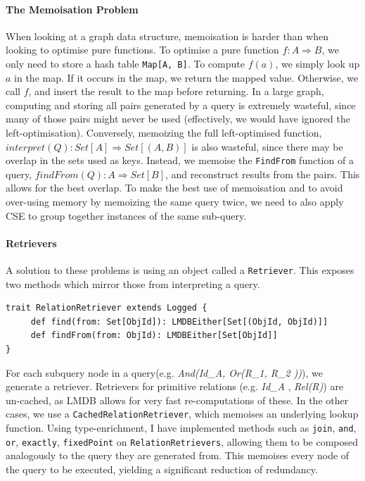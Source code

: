 \documentclass[12pt,a4paper,twoside,openright]{report}
\newcommand\codeName[1]{\texttt{#1}}
\newcommand\mathName[1]{\textit{#1}}
\renewcommand{\baselinestretch}{1.1}    %
\begin{document}
		\paragraph{The Memoisation Problem}
		When looking at a graph data structure, memoisation is harder than when looking to optimise pure functions. To optimise a pure function $f\colon A \Rightarrow B$, we only need to store a hash table \codeName{Map[A, B]}. To compute $f(a)$, we simply look up $a$ in the map. If it occurs in the map, we return the mapped value. Otherwise, we call $f$, and insert the result to the map before returning. In a large graph, computing and storing all pairs generated by a query is extremely wasteful, since many of those pairs might never be used (effectively, we would have ignored the left-optimisation). Conversely, memoizing the full left-optimised function, $interpret(Q)\colon Set[A] \Rightarrow Set[(A, B)]$ is also wasteful, since there may be overlap in the sets used as keys. Instead, we memoise the \codeName{FindFrom} function of a query, $findFrom(Q)\colon A \Rightarrow Set[B]$, and reconstruct results from the pairs. This allows for the best overlap. To make the best use of memoisation and to avoid over-using memory by memoizing the same query twice, we need to also apply CSE to group together instances of the same sub-query.

		\paragraph{Retrievers}
		A solution to these problems is using an object called a \codeName{Retriever}. This exposes two methods which mirror those from interpreting a query. 
		\renewcommand{\baselinestretch}{0.8}
		\begin{framed}
			\begin{verbatim}
trait RelationRetriever extends Logged {
     def find(from: Set[ObjId]): LMDBEither[Set[(ObjId, ObjId)]]
     def findFrom(from: ObjId): LMDBEither[Set[ObjId]]
}
			\end{verbatim}
		\end{framed}
		\renewcommand{\baselinestretch}{1.1}
		
		For each subquery node in a query(e.g. \mathName{And(Id_A, Or(R_1, R_2 ))}), we generate a retriever. Retrievers for primitive relations (e.g. \mathName{Id_A} , \mathName{Rel(R)}) are un-cached, as LMDB allows for very fast re-computations of these. In the other cases, we use a \codeName{CachedRelationRetriever}, which memoises an underlying lookup function. Using type-enrichment, I have implemented methods such as \codeName{join}, \codeName{and}, \codeName{or}, \codeName{exactly}, \codeName{fixedPoint} on \codeName{RelationRetrievers}, allowing them to be composed analogously to the query they are generated from. This memoises every node of the query to be executed, yielding a significant reduction of redundancy.
	
\end{document}
